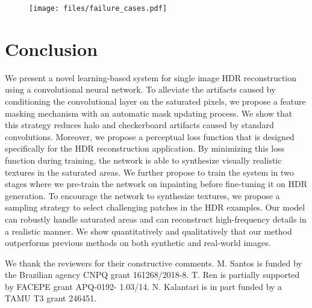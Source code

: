 \begin{figure}
  \texttt{[image: files/failure\_cases.pdf]}
  \vspace{-20pt}
  \caption{}
  \label{fig:failure_cases}
  \vspace{-0.2in}
\end{figure}

\section{Conclusion}
We present a novel learning-based system for single image HDR reconstruction using a convolutional neural network. To alleviate the artifacts caused by conditioning the convolutional layer on the saturated pixels, we propose a feature masking mechanism with an automatic mask updating process. We show that this strategy reduces halo and checkerboard artifacts caused by standard convolutions. Moreover, we propose a perceptual loss function that is designed specifically for the HDR reconstruction application. By minimizing this loss function during training, the network is able to synthesize visually realistic textures in the saturated areas. We further propose to train the system in two stages where we pre-train the network on inpainting before fine-tuning it on HDR generation. To encourage the network to synthesize textures, we propose a sampling strategy to select challenging patches in the HDR examples. Our model can robustly handle saturated areas and can reconstruct high-frequency details in a realistic manner. We show quantitatively and qualitatively that our method outperforms previous methods on both synthetic and real-world images.













\begin{acks}

We thank the reviewers for their constructive comments. M. Santos is funded by the Brazilian agency CNPQ grant 161268/2018-8. T. Ren is partially supported by FACEPE grant APQ-0192- 1.03/14. N. Kalantari is in part funded by a TAMU T3 grant 246451.




\end{acks}











